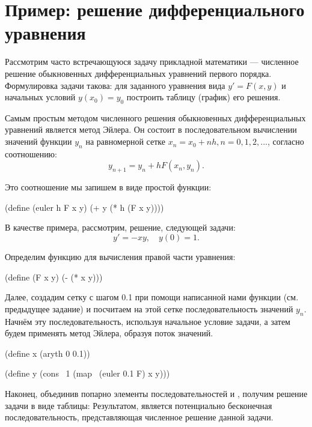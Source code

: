 \section[4]{Пример: решение дифференциального уравнения}%
Рассмотрим часто встречающуюся задачу прикладной математики --- численное решение обыкновенных дифференциальных уравнений первого порядка. Формулировка задачи такова: для заданного уравнения вида $y'=F(x,y)$ и начальных условий $y(x_0)=y_0$ построить таблицу (график) его решения.

Самым простым методом численного решения обыкновенных дифференциальных уравнений является метод Эйлера. Он состоит в последовательном вычислении значений функции $y_n$ на равномерной сетке $x_n = x_0 + n h, n = 0,1,2,...$, согласно соотношению:
$$y_{n+1} = y_n + h F(x_n,y_n).$$

Это соотношение мы запишем в виде простой функции:
\begin{Definition}[emph={f,x,y,h}]
(define (euler h F x y)
  (+ y (* h (F x y))))
\end{Definition}

В качестве примера, рассмотрим, решение, следующей задачи:
$$\label{ode}y'=-x y,\quad y(0)=1.$$

Определим функцию для вычисления правой части уравнения:
\begin{SchemeCode}
(define (F x y) (- (* x y)))
\end{SchemeCode}
\noindent%
Далее, создадим сетку с шагом 0.1 при помощи написанной нами функции  (см. предыдущее задание) и посчитаем на этой сетке последовательность значений $y_n$. Начнём эту последовательность, используя начальное условие задачи, а затем будем применять метод Эйлера, образуя поток значений.
\vspace{-\bigskipamount}
\begin{SchemeCode}[emph={}]
(define x (aryth 0 0.1))

(define y (cons~ 1 (map~ (euler 0.1 F) x y)))
\end{SchemeCode}
\noindent%
Наконец, объединив попарно элементы последовательностей  и , получим решение задачи в виде таблицы:
\vspace{-\medskipamount}
\vspace{-\medskipamount}
\vspace{-\medskipamount}
\vspace{-\medskipamount}
\vspace{-\medskipamount}
Результатом, является потенциально бесконечная последовательность, представляющая численное решение данной задачи.

